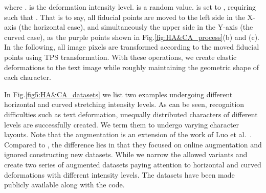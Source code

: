 where .  is the deformation intensity level.  is a random value.  is set to , requiring  such that . That is to say, all fiducial points are moved to the left side in the X-axis (the horizontal case), and simultaneously the upper side in the Y-axis (the curved case), as the purple points shown in Fig.\ref{fig:HA&CA_process}(b) and (c). In the following, all image pixels are transformed according to the moved fiducial points using TPS transformation. With these operations, we create elastic deformations to the text image while roughly maintaining the geometric shape of each character.

In Fig.\ref{fig5:HA&CA_datasets} we list two examples undergoing different horizontal and curved stretching intensity levels. As can be seen, recognition difficulties such as text deformation, unequally distributed characters of different levels are successfully created. We term them to undergo varying character layouts. Note that the augmentation is an extension of the work of Luo et al.~\citep{luo2020learn_to_aug}. Compared to \citep{luo2020learn_to_aug}, the difference lies in that they focused on online augmentation and ignored constructing new datasets. While we narrow the allowed variants and create two series of augmented datasets paying attention to horizontal and curved deformations with different intensity levels. The datasets have been made publicly available along with the code.

